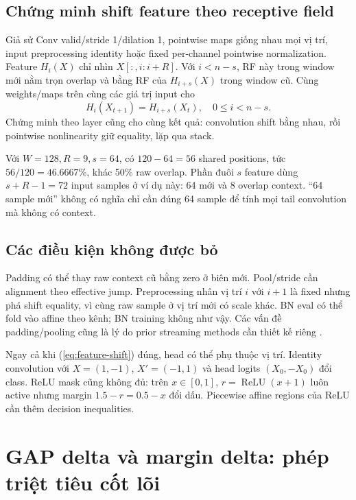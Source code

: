 \documentclass[11pt,a4paper]{article}
\newcommand{\relu}{\operatorname{ReLU}}
\theoremstyle{definition}
\begin{document}
\subsection{Chứng minh shift feature theo receptive field}
Giả sử Conv valid/stride 1/dilation 1, pointwise maps giống nhau mọi vị trí,
input preprocessing identity hoặc fixed per-channel pointwise normalization.
Feature $H_i(X)$ chỉ nhìn $X[:,i:i+R]$. Với $i<n-s$, RF này trong window
mới nằm trọn overlap và bằng RF của $H_{i+s}(X)$ trong window cũ. Cùng
weights/maps trên cùng các giá trị input cho
\begin{equation}
H_i(X_{t+1})=H_{i+s}(X_t),\quad 0\le i<n-s.
\label{eq:feature-shift}
\end{equation}
Chứng minh theo layer cũng cho cùng kết quả: convolution shift bằng nhau,
rồi pointwise nonlinearity giữ equality, lặp qua stack.

Với $W=128,R=9,s=64$, có $120-64=56$ shared positions, tức
$56/120=46.6667\%$, khác 50\% raw overlap. Phần đuôi $s$ feature dùng
$s+R-1=72$ input samples ở ví dụ này: 64 mới và 8 overlap context.
``64 sample mới'' không có nghĩa chỉ cần đúng 64 sample để tính mọi tail
convolution mà không có context.

\subsection{Các điều kiện không được bỏ}
Padding có thể thay raw context cũ bằng zero ở biên mới. Pool/stride cần
alignment theo effective jump. Preprocessing nhân vị trí $i$ với $i+1$ là
fixed nhưng phá shift equality, vì cùng raw sample ở vị trí mới có scale
khác. BN eval có thể fold vào affine theo kênh; BN training không như vậy.
Các vấn đề padding/pooling cũng là lý do prior streaming methods cần thiết
kế riêng \cite{streaminnc,tiny}.

Ngay cả khi (\ref{eq:feature-shift}) đúng, head có thể phụ thuộc vị trí.
Identity convolution với $X=(1,-1)$, $X'=(-1,1)$ và head logits
$(X_0,-X_0)$ đổi class. ReLU mask cũng không đủ: trên $x\in[0,1]$,
$r=\relu(x+1)$ luôn active nhưng margin $1.5-r=0.5-x$ đổi dấu. Piecewise
affine regions của ReLU \cite{montufar} cần thêm decision inequalities.

\section{GAP delta và margin delta: phép triệt tiêu cốt lõi}
\end{document}
